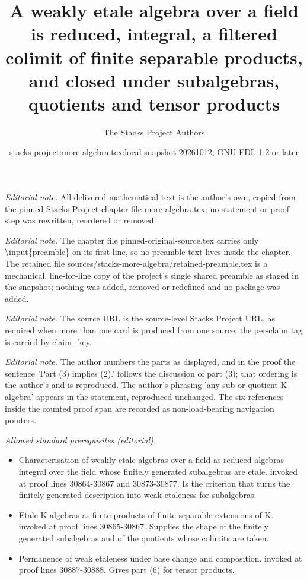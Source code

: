 \documentclass[10pt,a4paper]{amsart}
\title{A weakly etale algebra over a field is reduced, integral, a filtered colimit of finite separable products, and closed under subalgebras, quotients and tensor products}
\author{The Stacks Project Authors}
\date{stacks-project:more-algebra.tex:local-snapshot-20261012; GNU FDL 1.2 or later}
\theoremstyle{plain}
\theoremstyle{definition}
\theoremstyle{remark}
\numberwithin{equation}{subsection}
\begin{document}
\maketitle
\setcounter{subsection}{1}
\noindent\textit{Editorial note.} All delivered mathematical text is the author's own, copied from the pinned Stacks Project chapter file more-algebra.tex; no statement or proof step was rewritten, reordered or removed.\par\medskip
\noindent\textit{Editorial note.} The chapter file pinned-original-source.tex carries only \textbackslash{}input\{preamble\} on its first line, so no preamble text lives inside the chapter. The retained file sources/stacks-more-algebra/retained-preamble.tex is a mechanical, line-for-line copy of the project's single shared preamble as staged in the snapshot; nothing was added, removed or redefined and no package was added.\par\medskip
\noindent\textit{Editorial note.} The source URL is the source-level Stacks Project URL, as required when more than one card is produced from one source; the per-claim tag is carried by claim\_key.\par\medskip
\noindent\textit{Editorial note.} The author numbers the parts as displayed, and in the proof the sentence 'Part (3) implies (2).' follows the discussion of part (3); that ordering is the author's and is reproduced. The author's phrasing 'any sub or quotient K-algebra' appears in the statement, reproduced unchanged. The six references inside the counted proof span are recorded as non-load-bearing navigation pointers.\par\medskip
\noindent\textit{Allowed standard prerequisites (editorial).}\begin{itemize}
\item Characterisation of weakly etale algebras over a field as reduced algebras integral over the field whose finitely generated subalgebras are etale. invoked at proof lines 30864-30867 and 30873-30877. Is the criterion that turns the finitely generated description into weak etaleness for subalgebras.
\item Etale K-algebras as finite products of finite separable extensions of K. invoked at proof lines 30865-30867. Supplies the shape of the finitely generated subalgebras and of the quotients whose colimits are taken.
\item Permanence of weak etaleness under base change and composition. invoked at proof lines 30887-30888. Gives part (6) for tensor products.
\end{itemize}\medskip
\end{document}
